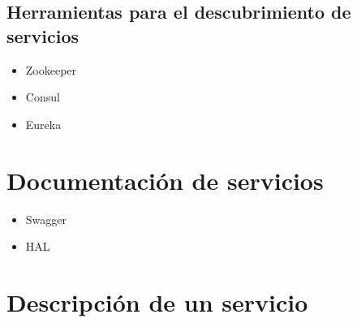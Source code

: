 \documentclass[11pt,a4paper]{article}
\begin{document}
\subsection{Herramientas para el descubrimiento de servicios}

\begin{itemize}
\item Zookeeper
\item Consul
\item Eureka
\end{itemize}

\section{Documentación de servicios}

\begin{itemize}
\item Swagger
\item HAL
\end{itemize}

\section{Descripción de un servicio}
\end{document}
